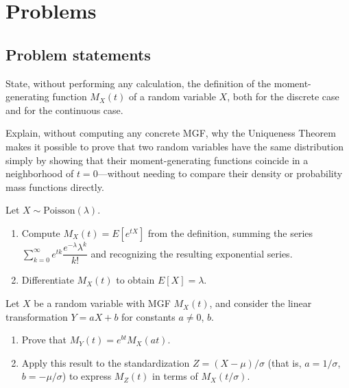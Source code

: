 \section*{Problems}

\subsection*{Problem statements}

\begin{problema}
	\label{prob:5a5f63a}
	State, without performing any calculation, the definition of the moment-generating function $M_X(t)$ of a random variable $X$, both for the discrete case and for the continuous case.
\end{problema}

\begin{problema}
	\label{prob:f26d9b0}
	Explain, without computing any concrete MGF, why the Uniqueness Theorem makes it possible to prove that two random variables have the same distribution simply by showing that their moment-generating functions coincide in a neighborhood of $t=0$---without needing to compare their density or probability mass functions directly.
\end{problema}

\begin{problema}
	\label{prob:2c4cd93}
	Let $X \sim \text{Poisson}(\lambda)$.
	\begin{enumerate}
		\item Compute $M_X(t) = E[e^{tX}]$ from the definition, summing the series $\sum_{k=0}^{\infty} e^{tk}\dfrac{e^{-\lambda}\lambda^k}{k!}$ and recognizing the resulting exponential series.
		\item Differentiate $M_X(t)$ to obtain $E[X]=\lambda$.
	\end{enumerate}
\end{problema}

\begin{problema}
	\label{prob:cf5e60c}
	Let $X$ be a random variable with MGF $M_X(t)$, and consider the linear transformation $Y = aX+b$ for constants $a\neq0$, $b$.
	\begin{enumerate}
		\item Prove that $M_Y(t) = e^{bt} M_X(at)$.
		\item Apply this result to the standardization $Z=(X-\mu)/\sigma$ (that is, $a=1/\sigma$, $b=-\mu/\sigma$) to express $M_Z(t)$ in terms of $M_X(t/\sigma)$.
	\end{enumerate}
\end{problema}

